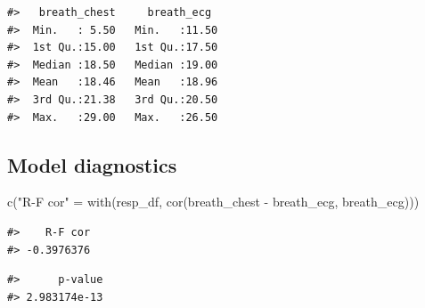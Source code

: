 \documentclass[
]{article}
\newenvironment{Shaded}{\begin{snugshade}}{\end{snugshade}}
\newcommand{\AttributeTok}[1]{\textcolor[rgb]{0.77,0.63,0.00}{#1}}
\newcommand{\ConstantTok}[1]{\textcolor[rgb]{0.00,0.00,0.00}{#1}}
\newcommand{\DecValTok}[1]{\textcolor[rgb]{0.00,0.00,0.81}{#1}}
\newcommand{\FunctionTok}[1]{\textcolor[rgb]{0.00,0.00,0.00}{#1}}
\newcommand{\NormalTok}[1]{#1}
\newcommand{\OtherTok}[1]{\textcolor[rgb]{0.56,0.35,0.01}{#1}}
\newcommand{\SpecialCharTok}[1]{\textcolor[rgb]{0.00,0.00,0.00}{#1}}
\newcommand{\StringTok}[1]{\textcolor[rgb]{0.31,0.60,0.02}{#1}}
\begin{document}
\begin{verbatim}
#>   breath_chest     breath_ecg   
#>  Min.   : 5.50   Min.   :11.50  
#>  1st Qu.:15.00   1st Qu.:17.50  
#>  Median :18.50   Median :19.00  
#>  Mean   :18.46   Mean   :18.96  
#>  3rd Qu.:21.38   3rd Qu.:20.50  
#>  Max.   :29.00   Max.   :26.50
\end{verbatim}

\hypertarget{model-diagnostics-1}{%
\subsection{Model diagnostics}\label{model-diagnostics-1}}

\begin{Shaded}
\begin{Highlighting}[]
\FunctionTok{c}\NormalTok{(}\StringTok{"R{-}F cor"} \OtherTok{=} \FunctionTok{with}\NormalTok{(resp\_df, }\FunctionTok{cor}\NormalTok{(breath\_chest }\SpecialCharTok{{-}}\NormalTok{ breath\_ecg, breath\_ecg)))}
\end{Highlighting}
\end{Shaded}

\begin{verbatim}
#>    R-F cor 
#> -0.3976376
\end{verbatim}

\begin{Shaded}
\end{Shaded}

\begin{verbatim}
#>      p-value 
#> 2.983174e-13
\end{verbatim}
\end{document}
